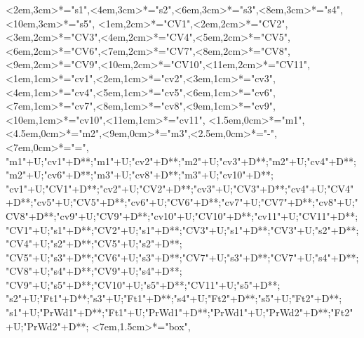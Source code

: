 \begin{multicols}{2}
\begin{exe}
{\begin{xlist}
{		<2em,3cm>*="s1",<4em,3cm>*="s2",<6em,3cm>*="s3",<8em,3cm>*="s4",<10em,3cm>*="s5",
		<1em,2cm>*="CV1",<2em,2cm>*="CV2",<3em,2cm>*="CV3",<4em,2cm>*="CV4",<5em,2cm>*="CV5",<6em,2cm>*="CV6",<7em,2cm>*="CV7",<8em,2cm>*="CV8",<9em,2cm>*="CV9",<10em,2cm>*="CV10",<11em,2cm>*="CV11",
		<1em,1cm>*="cv1",<2em,1cm>*="cv2",<3em,1cm>*="cv3",<4em,1cm>*="cv4",<5em,1cm>*\as{ }="cv5",<6em,1cm>*="cv6",<7em,1cm>*="cv7",<8em,1cm>*="cv8",<9em,1cm>*\as{ }="cv9",<10em,1cm>*="cv10",<11em,1cm>*\as{ }="cv11",
		<1.5em,0cm>*="m1",<4.5em,0cm>*="m2",<9em,0cm>*="m3",<2.5em,0cm>*\as{-}="-",<7em,0cm>*\as{=}="=",
		"m1"+U;"cv1"+D**\dir{-};"m1"+U;"cv2"+D**\dir{-};"m2"+U;"cv3"+D**\dir{-};"m2"+U;"cv4"+D**\dir{-};"m2"+U;"cv6"+D**\dir{-};"m3"+U;"cv8"+D**\dir{-};"m3"+U;"cv10"+D**\dir{-};
		"cv1"+U;"CV1"+D**\dir{-};"cv2"+U;"CV2"+D**\dir{-};"cv3"+U;"CV3"+D**\dir{-};"cv4"+U;"CV4"+D**\dir{-};"cv5"+U;"CV5"+D**\dir{};"cv6"+U;"CV6"+D**\dir{-};"cv7"+U;"CV7"+D**\dir{-};"cv8"+U;"CV8"+D**\dir{-};"cv9"+U;"CV9"+D**\dir{};"cv10"+U;"CV10"+D**\dir{-};"cv11"+U;"CV11"+D**\dir{};
		"CV1"+U;"s1"+D**\dir{-};"CV2"+U;"s1"+D**\dir{-};"CV3"+U;"s1"+D**\dir{-};"CV3"+U;"s2"+D**\dir{-};"CV4"+U;"s2"+D**\dir{-};"CV5"+U;"s2"+D**\dir{-};
		"CV5"+U;"s3"+D**\dir{-};"CV6"+U;"s3"+D**\dir{-};"CV7"+U;"s3"+D**\dir{-};"CV7"+U;"s4"+D**\dir{-};"CV8"+U;"s4"+D**\dir{-};"CV9"+U;"s4"+D**\dir{-};
		"CV9"+U;"s5"+D**\dir{-};"CV10"+U;"s5"+D**\dir{-};"CV11"+U;"s5"+D**\dir{-};
		"s2"+U;"Ft1"+D**\dir{-};"s3"+U;"Ft1"+D**\dir{-};"s4"+U;"Ft2"+D**\dir{-};"s5"+U;"Ft2"+D**\dir{-};
		"s1"+U;"PrWd1"+D**\dir{-};"Ft1"+U;"PrWd1"+D**\dir{-};"PrWd1"+U;"PrWd2"+D**\dir{-};"Ft2"+U;"PrWd2"+D**\dir{-};
		<7em,1.5cm>*="box",
	\endxy}\label{as:natuagw=ee2}
	\end{xlist}}
\end{exe}
\end{multicols}


